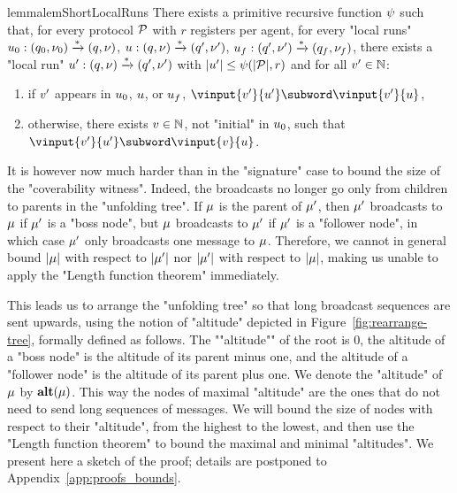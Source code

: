 	\begin{restatable}{lemma}{lemShortLocalRuns}
	\label{lem:short-local-runs}
	There exists a primitive recursive function $\psi$ such that, for every protocol $\mathcal{P}$ with $r$ registers per agent, 
	for every "local runs" $u_0: (q_0, \nu_0) \xrightarrow{*} (q, \nu)$, $u: (q, \nu) \xrightarrow{*} (q', \nu')$, $u_f: (q', \nu') \xrightarrow{*} (q_f, \nu_f)$, there exists a "local run" $u': (q, \nu) \xrightarrow{*} (q', \nu')$ with $|u'| \leq \psi(|\mathcal{P}| ,r)$ and for all $v' \in \mathbb{N}$: 
	\begin{enumerate}
		\item if $v'$ appears in $u_0$, $u$, or $u_{f}$, $\vinput{\aval'}{\localrun'} \subword \vinput{\aval'}{\localrun}$,
		\item  otherwise, there exists $v \in \mathbb{N}$, not "initial" in $u_0$, such that $\vinput{\aval'}{\localrun'} \subword \vinput{\aval}{\localrun}$.
	\end{enumerate}
\end{restatable}

It is however now much harder than in the "signature" case to bound the size of the "coverability witness". Indeed, the broadcasts no longer go only from children to parents in the "unfolding tree". If $\mu$ is the parent of $\mu'$, then $\mu'$ broadcasts to $\mu$ if $\mu'$ is a "boss node", but $\mu$ broadcasts to $\mu'$ if $\mu'$ is a "follower node", in which case $\mu'$ only broadcasts one message to $\mu$. Therefore, we cannot in general bound $|\mu|$ with respect to $|\mu'|$ nor $|\mu'|$ with respect to $|\mu|$, making us unable to apply the "Length function theorem" immediately. 

This leads us to arrange the "unfolding tree" so that long broadcast sequences are sent upwards, using the notion of "altitude" depicted in Figure~\ref{fig:rearrange-tree}, formally defined as follows.
The ""altitude"" of the root is $0$, the altitude of a "boss node" is the altitude of its parent minus one, and the altitude of a "follower node" is the altitude of its parent plus one.
We denote the "altitude" of $\mu$ by $\mathbf{alt}(\mu)$.
This way the nodes of maximal "altitude" are the ones that do not need to send long sequences of messages. We will bound the size of nodes with respect to their "altitude", from the highest to the lowest, and then use the "Length function theorem" to bound the maximal and minimal "altitudes". We present here a sketch of the proof; details are postponed to Appendix~\ref{app:proofs_bounds}. 


